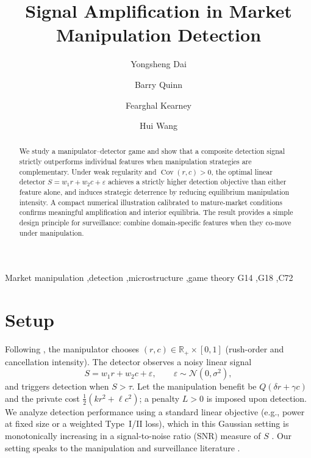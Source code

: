 \documentclass[preprint,12pt,authoryear]{elsarticle}
\begin{document}
\begin{frontmatter}

\title{Signal Amplification in Market Manipulation Detection}

\author[qub]{Yongsheng Dai}
\author[uu]{Barry Quinn}
\author[qbs]{Fearghal Kearney}
\author[qub]{Hui Wang}

\address[qub]{School of EEECS, Queen's University Belfast}
\address[uu]{Ulster University Business School, Ulster University}
\address[qbs]{Queen's Business School, Queen's University Belfast}

\begin{abstract}
We study a manipulator--detector game and show that a composite detection signal strictly outperforms individual features when manipulation strategies are complementary. Under weak regularity and $\operatorname{Cov}(r,c)>0$, the optimal linear detector $S=w_1 r + w_2 c + \varepsilon$ achieves a strictly higher detection objective than either feature alone, and induces strategic deterrence by reducing equilibrium manipulation intensity. A compact numerical illustration calibrated to mature-market conditions confirms meaningful amplification and interior equilibria. The result provides a simple design principle for surveillance: combine domain-specific features when they co-move under manipulation.
\end{abstract}

\begin{keyword}
Market manipulation \sep detection \sep microstructure \sep game theory
\JEL G14 \sep G18 \sep C72
\end{keyword}

\end{frontmatter}
\newpage


\section{Setup}
Following \citet{vila1989simple}, the manipulator chooses $(r,c)\in\mathbb{R}_+\times[0,1]$ (rush-order and cancellation intensity). The detector observes a noisy linear signal
\begin{equation}
S=w_1 r + w_2 c + \varepsilon,\qquad \varepsilon\sim \mathcal{N}(0,\sigma^2),\label{eq:signal}
\end{equation}
and triggers detection when $S>\tau$. Let the manipulation benefit be $Q(\delta r + \gamma c)$ and the private cost $\tfrac{1}{2}(k r^2 + \ell c^2)$; a penalty $L>0$ is imposed upon detection. We analyze detection performance using a standard linear objective (e.g., power at fixed size or a weighted Type~I/II loss), which in this Gaussian setting is monotonically increasing in a signal-to-noise ratio (SNR) measure of $S$ \citep{kay1998fundamentals}. Our setting speaks to the manipulation and surveillance literature \citep{aggarwal2006stock,putnins2012market}.
\end{document}
